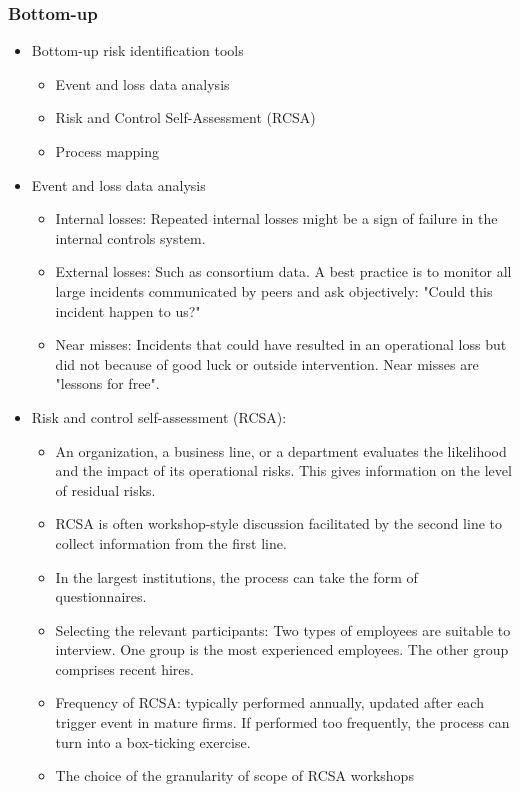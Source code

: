 \subsubsection{Bottom-up}
\begin{itemize}
\item Bottom-up risk identification tools
    \begin{itemize}
    \item Event and loss data analysis
    \item Risk and Control Self-Assessment (RCSA)
    \item Process mapping
    \end{itemize}
\item Event and loss data analysis
    \begin{itemize}
    \item Internal losses: Repeated internal losses might be a sign of failure in the internal controls system.
    \item  External losses: Such as consortium data. A best practice is to monitor all large incidents communicated by peers and ask objectively: "Could this incident happen to us?"
    \item  Near misses: Incidents that could have resulted in an operational loss but did not because of good luck or outside intervention. Near misses are "lessons for free".
    \end{itemize}
\item Risk and control self-assessment (RCSA):
    \begin{itemize}
    \item An organization, a business line, or a department evaluates the likelihood and the impact of its operational risks. This gives information on the level of residual risks.
    \item  RCSA is often workshop-style discussion facilitated by the second line to collect information from the first line.
    \item  In the largest institutions, the process can take the form of questionnaires.
    \item Selecting the relevant participants: Two types of employees are suitable to interview. One group is the most experienced employees. The other group comprises recent hires.
    \item  Frequency of RCSA: typically performed annually, updated after each trigger event in mature firms. If performed too frequently, the process can turn into a box-ticking exercise.
    \item The choice of the granularity of scope of RCSA workshops

\end{itemize}
\end{itemize}
